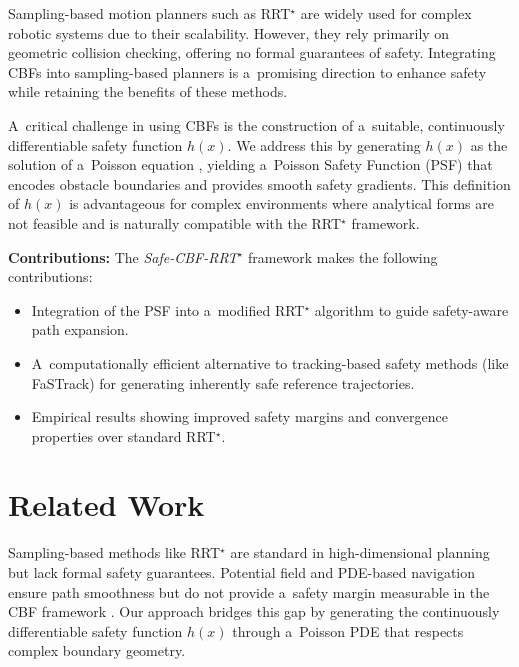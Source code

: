 \documentclass[letterpaper, 10 pt, conference]{ieeeconf}
\begin{document}
Sampling-based motion planners such as RRT$^\star$ \cite{karaman2011samplingbasedalgorithmsoptimalmotion} are widely used for complex robotic systems due to their scalability. However, they rely primarily on geometric collision checking, offering no formal guarantees of safety. Integrating CBFs into sampling-based planners is a~promising direction to enhance safety while retaining the benefits of these methods.

A~critical challenge in using CBFs is the construction of a~suitable, continuously differentiable safety function $h(x)$. We address this by generating $h(x)$ as the solution of a~Poisson equation \cite{bahati2025dynamicsafetycomplexenvironments}, yielding a~Poisson Safety Function (PSF) that encodes obstacle boundaries and provides smooth safety gradients. This definition of $h(x)$ is advantageous for complex environments where analytical forms are not feasible and is naturally compatible with the RRT$^\star$ framework.

\textbf{Contributions:}
The \emph{Safe-CBF-RRT$^\star$} framework makes the following contributions:
\begin{itemize}
    \item Integration of the PSF into a~modified RRT$^\star$ algorithm to guide safety-aware path expansion.
    \item A~computationally efficient alternative to tracking-based safety methods (like FaSTrack) for generating inherently safe reference trajectories.
    \item Empirical results showing improved safety margins and convergence properties over standard RRT$^\star$.
\end{itemize}

\section{Related Work}
Sampling-based methods like RRT$^\star$
\cite{karaman2011samplingbasedalgorithmsoptimalmotion} are standard in
high-dimensional planning but lack formal safety guarantees. Potential field and
PDE-based navigation \cite{s22093295} ensure path smoothness but do not provide
a~safety margin measurable in the CBF framework \cite{8796030}. Our approach
bridges this gap by generating the continuously differentiable safety function
$h(x)$ through a~Poisson PDE \cite{bahati2025dynamicsafetycomplexenvironments, BahatiSafeSS}
that respects complex boundary geometry.
\end{document}
